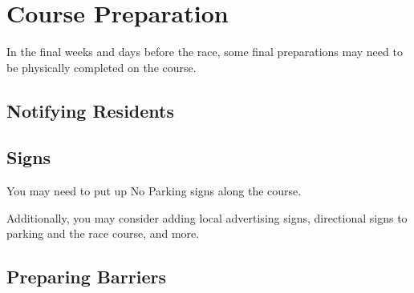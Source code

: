 \documentclass[
  letterpaper, %
  fontsize=10pt, %
  twoside=true,
  chapterentrydots=true, %
  numbers=noenddot,
  fontmethod=tex,
]{kaobook}
\begin{document}





\section{Course Preparation}

In the final weeks and days before the race,
some final preparations may need to be physically completed on the course.

\subsection{Notifying Residents}

\subsection{Signs}

You may need to put up No Parking signs along the course.

Additionally, you may consider adding local advertising signs,
directional signs to parking and the race course, and more.

\subsection{Preparing Barriers}
\end{document}
